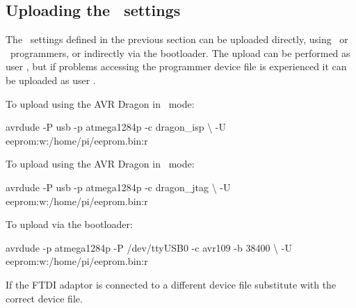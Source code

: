 \subsection[Uploading the EEPROM settings]{Uploading the \eeprom\
  settings}

The \eeprom\ settings defined in the previous section can be uploaded
directly, using \isp\ or \jtag\ programmers, or indirectly via the
\filename{xboot} bootloader. The upload can be performed as user
\piUser, but if problems accessing the programmer device file is
experienced it can be uploaded as user \rootUser.

To upload using the AVR Dragon in \isp\ mode:
\begin{Cmd}
avrdude -P usb -p atmega1284p -c dragon_isp \textbackslash
-U eeprom:w:/home/pi/eeprom.bin:r 
\end{Cmd}

To upload using the AVR Dragon in \jtag\ mode:
\begin{Cmd}
avrdude -P usb -p atmega1284p -c dragon_jtag \textbackslash
-U eeprom:w:/home/pi/eeprom.bin:r 
\end{Cmd}

To upload via the  bootloader:
\begin{Cmd}
avrdude -p atmega1284p -P /dev/ttyUSB0 -c avr109 -b 38400 \textbackslash
-U eeprom:w:/home/pi/eeprom.bin:r 
\end{Cmd}
If the FTDI adaptor is connected to a different device file substitute
\filename{/dev/ttyUSB0} with the correct device file.
